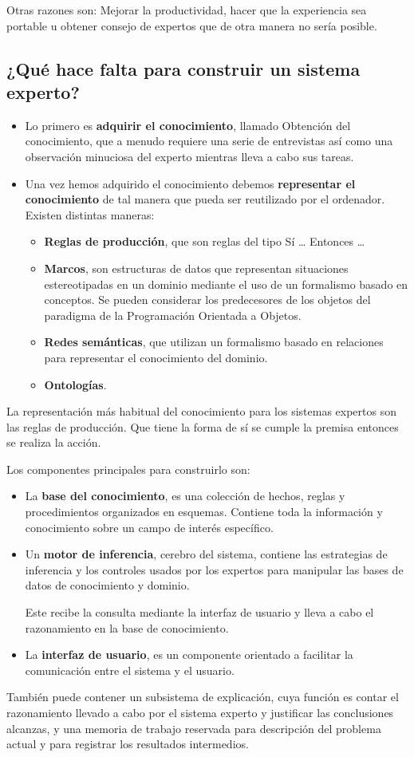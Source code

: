 \documentclass[12pt, twoside, openright]{report} %
\begin{document}
Otras razones son: Mejorar la productividad, hacer que la experiencia sea portable u obtener consejo de expertos que de otra manera no sería posible.

\subsection{¿Qué hace falta para construir un sistema experto?}
\begin{itemize}
	\item Lo primero es \textbf{adquirir el conocimiento}, llamado Obtención del conocimiento, que a menudo requiere una serie de entrevistas así como una observación minuciosa del experto mientras lleva a cabo sus tareas.
	\item Una vez hemos adquirido el conocimiento debemos \textbf{representar el conocimiento} de tal manera que pueda ser reutilizado por el ordenador. Existen distintas maneras:
	      \begin{itemize}
		      \item \textbf{Reglas de producción}, que son reglas del tipo Sí … Entonces …
		      \item \textbf{Marcos}, son estructuras de datos que representan situaciones estereotipadas en un dominio mediante el uso de un formalismo basado en conceptos. Se pueden considerar los predecesores de los objetos del paradigma de la Programación Orientada a Objetos.
		      \item \textbf{Redes semánticas}, que utilizan un formalismo basado en relaciones para representar el conocimiento del dominio.
		      \item \textbf{Ontologías}.
	      \end{itemize}
\end{itemize}
La representación más habitual del conocimiento para los sistemas expertos son las reglas de producción. Que tiene la forma de sí se cumple la premisa entonces se realiza la acción.

Los componentes principales para construirlo son:
\begin{itemize}
	\item La \textbf{base del conocimiento}, es una colección de hechos, reglas y procedimientos organizados en esquemas. Contiene toda la información y conocimiento sobre un campo de interés específico.
	\item Un \textbf{motor de inferencia}, cerebro del sistema, contiene las estrategias de inferencia y los controles usados por los expertos para manipular las bases de datos de conocimiento y dominio.

	      Este recibe la consulta mediante la interfaz de usuario y lleva a cabo el razonamiento en la base de conocimiento.
	\item La \textbf{interfaz de usuario}, es un componente orientado a facilitar la comunicación entre el sistema y el usuario.
\end{itemize}
También puede contener un subsistema de explicación, cuya función es contar el razonamiento llevado a cabo por el sistema experto y justificar las conclusiones alcanzas, y una memoria de trabajo reservada para descripción del problema actual y para registrar los resultados intermedios.
\end{document}
